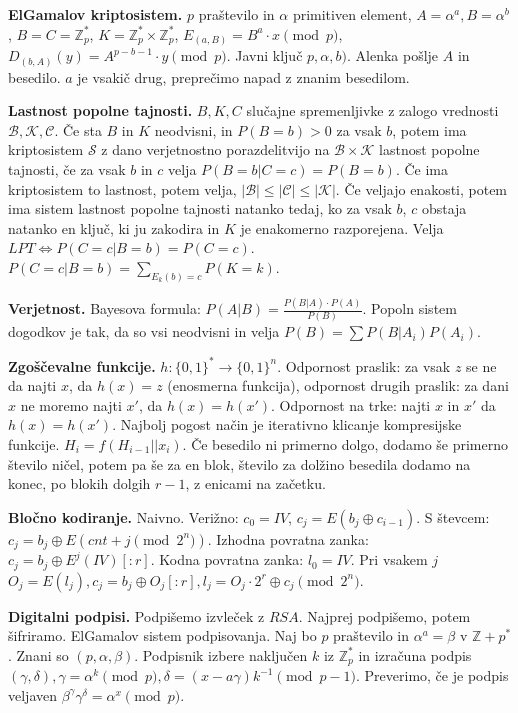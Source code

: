 \documentclass[a4paper, oneside, 10pt]{article}
\theoremstyle{definition}
\def\Z{\mathbb{Z}}
\begin{document}
\textbf{ElGamalov kriptosistem.} $p$ praštevilo in $\alpha$ primitiven element, $A = \alpha^a, B =
\alpha^b$, $B = C = \Z_p^\ast$, $K = \Z_p^\ast \times \Z_p^\ast$, $E_{(a,B)} = B^a \cdot x
\pmod{p}$, $D_{(b,A)}(y) = A^{p-b-1} \cdot y \pmod{p}$. Javni ključ $p,\alpha, b)$. Alenka pošlje
$A$ in besedilo. $a$ je vsakič drug, preprečimo napad z znanim besedilom.

\textbf{Lastnost popolne tajnosti.} $B, K, C$ slučajne spremenljivke z zalogo vrednosti $\mathcal B,
\mathcal K, \mathcal C$. Če sta $B$ in $K$ neodvisni, in $P(B = b) > 0$ za vsak $b$, potem ima
kriptosistem $\mathcal S$ z dano verjetnostno porazdelitvijo na $\mathcal B \times \mathcal K$
lastnost popolne tajnosti, če za vsak $b$ in $c$ velja $P(B=b|C=c) = P(B=b)$.
Če ima kriptosistem to lastnost, potem velja, $|\mathcal B| \leq |\mathcal C| \leq |\mathcal K|$. Če
veljajo enakosti, potem ima sistem lastnost popolne tajnosti natanko tedaj, ko za vsak $b$, $c$
obstaja natanko en ključ, ki ju zakodira in $K$ je enakomerno razporejena.
Velja $LPT \iff  P(C=c|B=b) = P(C=c)$. $P(C=c|B=b) = \sum_{E_k(b)=c} P(K=k)$.

\textbf{Verjetnost.}
Bayesova formula: $P(A|B) = \frac{P(B|A) \cdot P(A)}{P(B)}$.
Popoln sistem dogodkov je tak, da so vsi neodvisni in velja $P(B) = \sum P(B|A_i)P(A_i)$.

\textbf{Zgoščevalne funkcije.} $h: \{0,1\}^\ast \to \{0,1\}^n$. Odpornost praslik: za vsak $z$ se ne da
najti $x$, da $h(x) = z$ (enosmerna funkcija), odpornost drugih praslik: za dani $x$ ne moremo najti $x'$, da $h(x) =
h(x')$. Odpornost na trke: najti $x$ in $x'$ da $h(x) = h(x')$. Najbolj pogost način je iterativno
klicanje kompresijske funkcije. $H_i = f(H_{i-1}||x_i)$. Če besedilo ni primerno dolgo, dodamo še
primerno število ničel, potem pa še za en blok, število za dolžino besedila dodamo na konec, po
blokih dolgih $r-1$, z enicami na začetku.

\textbf{Bločno kodiranje.}
Naivno. Verižno: $c_0 = IV$, $c_j = E(b_j\oplus c_{i-1})$. S števcem: $c_j = b_j \oplus E(cnt + j
\pmod{2^n})$. Izhodna povratna zanka: $c_j = b_j \oplus E^j(IV)[:r]$. Kodna povratna zanka:
$l_0 = IV$. Pri vsakem $j$ $O_j = E(l_j), c_j = b_j \oplus O_j[:r], l_j = O_j\cdot 2^r \oplus c_j
\pmod{2^n}$.

\textbf{Digitalni podpisi.} Podpišemo izvleček z $RSA$. Najprej podpišemo, potem šifriramo.
ElGamalov sistem podpisovanja. Naj bo $p$ praštevilo in $\alpha^a=\beta$ v $\Z+p^\ast$. Znani so
$(p, \alpha, \beta)$. Podpisnik izbere naključen $k$ iz $\Z_p^\ast$ in izračuna podpis $(\gamma,
\delta), \gamma = \alpha^k \pmod{p}, \delta = (x-a\gamma)k^{-1} \pmod{p-1}$. Preverimo, če je podpis
veljaven $\beta^\gamma\gamma^\delta = \alpha^x \pmod{p}$.
\end{document}
